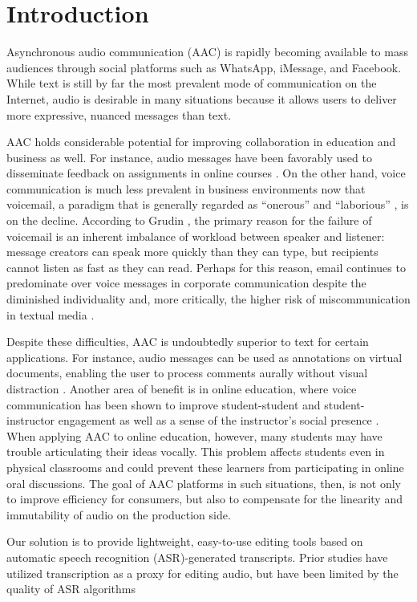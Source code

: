 \section{Introduction}

Asynchronous audio communication (AAC) is rapidly becoming available to mass audiences through social platforms such as WhatsApp, iMessage, and Facebook. 
While text is still by far the most prevalent mode of communication on the Internet, audio is desirable in many situations because it allows users to deliver more expressive, nuanced messages than text.

AAC holds considerable potential for improving collaboration in education and business as well. 
For instance, audio messages have been favorably used to disseminate feedback on assignments in online courses \cite{ice,oomen}. 
On the other hand, voice communication is much less prevalent in business environments now that voicemail, a paradigm that is generally regarded as ``onerous'' and ``laborious'' \cite{whittaker}, is on the decline. 
According to Grudin \cite{grudin}, the primary reason for the failure of voicemail is an inherent imbalance of workload between speaker and listener: message creators can speak more quickly than they can type, but recipients cannot listen as fast as they can read. 
Perhaps for this reason, email continues to predominate over voice messages in corporate communication despite the diminished individuality and, more critically, the higher risk of miscommunication in textual media \cite{byron}.

Despite these difficulties, AAC is undoubtedly superior to text for certain applications. 
For instance, audio messages can be used as annotations on virtual documents, enabling the user to process comments aurally without visual distraction \cite{yoon}.
Another area of benefit is in online education, where voice communication has been shown to improve student-student and student-instructor engagement as well as a sense of the instructor's social presence \cite{oomen,tu}. 
When applying AAC to online education, however, many students may have trouble articulating their ideas vocally.
This problem affects students even in physical classrooms and could prevent these learners from participating in online oral discussions.
The goal of AAC platforms in such situations, then, is not only to improve efficiency for consumers, but also to compensate for the linearity and immutability of audio on the production side.

Our solution is to provide lightweight, easy-to-use editing tools based on automatic speech recognition (ASR)-generated transcripts.
Prior studies have utilized transcription as a proxy for editing audio, but have been limited by the quality of ASR algorithms

